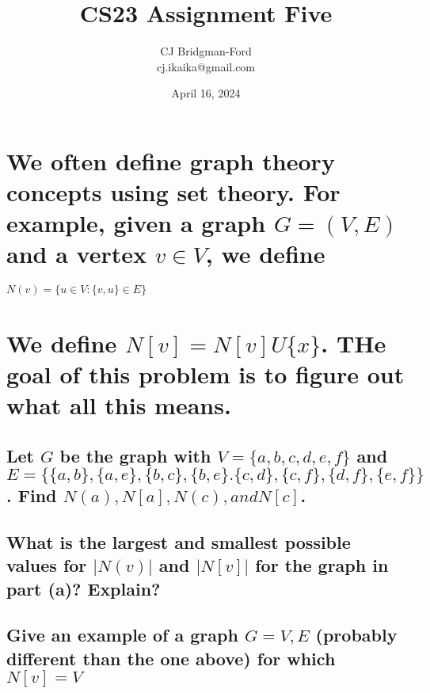 \documentclass{article}
\title{CS23 Assignment Five}
\author{CJ Bridgman-Ford \\ cj.ikaika@gmail.com}
\date{April 16, 2024}
\begin{document}
\maketitle
\thispagestyle{empty}

\clearpage


\section{We often define graph theory concepts using set theory. For example, given a graph $G=(V,E)$ and a vertex $v \in V$, we define}
\begin{center}
    $N(v) = \{u \in V : \{v,u\}\in E\}$
\end{center}
\section*{We define $N[v]=N[v]U\{x\}$. THe goal of this problem is to figure out what all this means.}
\subsection{Let $G$ be the graph with $V=\{a,b,c,d,e,f\}$ and $E=\{\{a,b\},\{a,e\},\{b,c\},\{b,e\}.\{c,d\},\{c,f\},\{d,f\},\{e,f\}\}$. Find $N(a), N[a], N(c), and N[c]$.}
\subsection{What is the largest and smallest possible values for $|N(v)|$ and $|N[v]|$ for the graph in part (a)? Explain?}
\subsection{Give an example of a graph $G={V,E}$ (probably different than the one above) for which $N[v]=V$}
\end{document}
